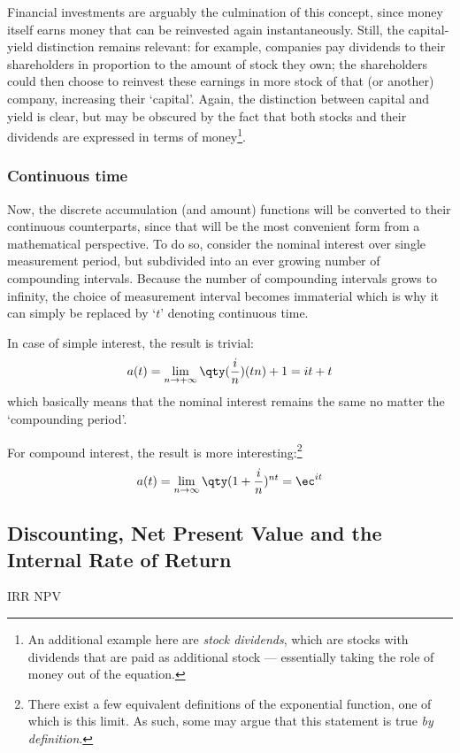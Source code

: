 Financial investments are arguably the culmination of this concept, since money itself earns money that can be reinvested again instantaneously. Still, the capital-yield distinction remains relevant: for example, companies pay dividends to their shareholders in proportion to the amount of stock they own; the shareholders could then choose to reinvest these earnings in more stock of that (or another) company, increasing their `capital'. Again, the distinction between capital and yield is clear, but may be obscured by the fact that both stocks and their dividends are expressed in terms of money\footnote{An additional example here are \emph{stock dividends}, which are stocks with dividends that are paid as additional stock --- essentially taking the role of money out of the equation.}. 

\subsubsection{Continuous time}
Now, the discrete accumulation (and amount) functions will be converted to their continuous counterparts, since that will be the most convenient form from a mathematical perspective. To do so, consider the nominal interest over single measurement period, but subdivided into an ever growing number of compounding intervals. Because the number of compounding intervals grows to infinity, the choice of measurement interval becomes immaterial which is why it can simply be replaced by `\(t\)' denoting continuous time.

In case of simple interest, the result is trivial:
 \[
     a(t) = \lim_{n \to +\infty} \qty(\frac{i}{n}) (tn) + 1 = it + t
\]
which basically means that the nominal interest remains the same no matter the `compounding period'.

For compound interest, the result is more interesting:\footnote{There exist a few equivalent definitions of the exponential function, one of which is this limit. As such, some may argue that this statement is true \emph{by definition}.}
 \[
     a(t) = \lim_{n \to \infty} \qty(1 + \frac{i}{n})^{nt} = \ec^{it}
\]
 
\subsection{Discounting, Net Present Value and the Internal Rate of Return}
\ac{IRR}
\ac{NPV}


